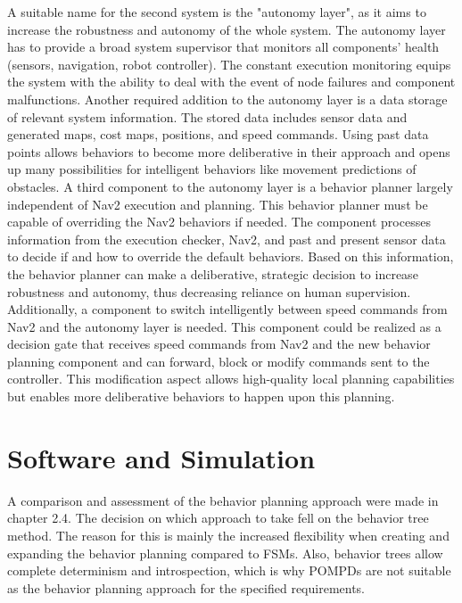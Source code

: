 A suitable name for the second system is the "autonomy layer", as it aims to increase the robustness and autonomy of the whole system. 
The autonomy layer has to provide a broad system supervisor that monitors all components' health (sensors, navigation, robot controller). The constant execution monitoring equips the system with the ability to deal with the event of node failures and component malfunctions. 
Another required addition to the autonomy layer is a data storage of relevant system information. The stored data includes sensor data and generated maps, cost maps, positions, and speed commands. Using past data points allows behaviors to become more deliberative in their approach and opens up many possibilities for intelligent behaviors like movement predictions of obstacles. 
A third component to the autonomy layer is a behavior planner largely independent of Nav2 execution and planning. This behavior planner must be capable of overriding the Nav2 behaviors if needed. The component processes information from the execution checker, Nav2, and past and present sensor data to decide if and how to override the default behaviors. Based on this information, the behavior planner can make a deliberative, strategic decision to increase robustness and autonomy, thus decreasing reliance on human supervision.
Additionally, a component to switch intelligently between speed commands from Nav2 and the autonomy layer is needed. This component could be realized as a decision gate that receives speed commands from Nav2 and the new behavior planning component and can forward, block or modify commands sent to the controller. This modification aspect allows high-quality local planning capabilities but enables more deliberative behaviors to happen upon this planning.



\section{Software and Simulation}
A comparison and assessment of the behavior planning approach were made in chapter 2.4. The decision on which approach to take fell on the behavior tree method. The reason for this is mainly the increased flexibility when creating and expanding the behavior planning compared to FSMs. Also, behavior trees allow complete determinism and introspection, which is why POMPDs are not suitable as the behavior planning approach for the specified requirements. 

